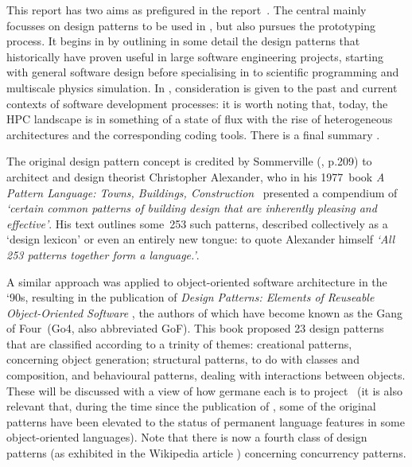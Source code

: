 This report has two aims as prefigured in the report~\cite{y1re311}. The central  mainly focusses on
design patterns to be used in \nep, but also pursues the prototyping process.
It begins in  by outlining in some detail the design patterns that historically have proven useful in large software engineering projects,
starting with general software design before specialising in  to scientific programming and multiscale physics simulation.  
In , consideration is given to the past and current contexts of software development processes: it is worth noting that,
today, the HPC landscape is in something of a state of flux with the rise of heterogeneous architectures and the
corresponding coding tools. There is a final summary .

The original design pattern concept is credited by Sommerville (\cite{sommerville}, p.209) to architect and design theorist
Christopher Alexander, who in his 1977~book {\it A Pattern Language: Towns, Buildings, Construction}~\cite{christopheralexander}
presented a compendium of {\it `certain common patterns of building design that are inherently pleasing and effective'}.
His text outlines some~253 such patterns, described collectively as a `design lexicon' or even an entirely new tongue:
to quote Alexander himself {\it `All 253 patterns together form a language.'}.

A similar approach was applied to object-oriented software architecture in the `90s, resulting in the publication
of {\it Design Patterns: Elements of Reuseable Object-Oriented Software} \cite{gammahelmjohnsonvlissides}, the
authors of which have become known as the Gang of Four~(Go4, also abbreviated GoF).
This book proposed 23 design patterns that are classified according to a trinity of themes: creational patterns,
concerning object generation; structural patterns, to do with classes and composition, and behavioural patterns,
dealing with interactions between objects.
These will be discussed with a view of how germane each is to project \nep \ (it is also relevant that,
during the time since the publication of \cite{gammahelmjohnsonvlissides}, some of the original patterns
have been elevated to the status of permanent language features in some object-oriented languages).
Note that there is now a fourth class of design patterns (as exhibited in the Wikipedia article
\cite{softwarepatternwiki}) concerning concurrency patterns.

